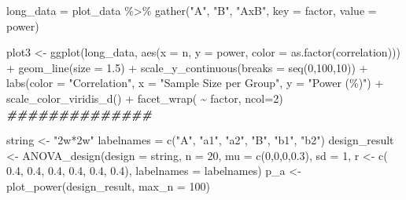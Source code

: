 \documentclass[
]{book}
\newenvironment{Shaded}{\begin{snugshade}}{\end{snugshade}}
\newcommand{\AttributeTok}[1]{\textcolor[rgb]{0.77,0.63,0.00}{#1}}
\newcommand{\DecValTok}[1]{\textcolor[rgb]{0.00,0.00,0.81}{#1}}
\newcommand{\DocumentationTok}[1]{\textcolor[rgb]{0.56,0.35,0.01}{\textbf{\textit{#1}}}}
\newcommand{\FloatTok}[1]{\textcolor[rgb]{0.00,0.00,0.81}{#1}}
\newcommand{\FunctionTok}[1]{\textcolor[rgb]{0.00,0.00,0.00}{#1}}
\newcommand{\NormalTok}[1]{#1}
\newcommand{\OtherTok}[1]{\textcolor[rgb]{0.56,0.35,0.01}{#1}}
\newcommand{\SpecialCharTok}[1]{\textcolor[rgb]{0.00,0.00,0.00}{#1}}
\newcommand{\StringTok}[1]{\textcolor[rgb]{0.31,0.60,0.02}{#1}}
\begin{document}
\begin{Shaded}
\begin{Highlighting}[]
\NormalTok{long\_data }\OtherTok{=}\NormalTok{ plot\_data }\SpecialCharTok{\%\textgreater{}\%}
  \FunctionTok{gather}\NormalTok{(}\StringTok{"A"}\NormalTok{, }\StringTok{"B"}\NormalTok{, }\StringTok{"AxB"}\NormalTok{, }\AttributeTok{key =}\NormalTok{ factor, }\AttributeTok{value =}\NormalTok{ power)}

\NormalTok{plot3 }\OtherTok{\textless{}{-}} \FunctionTok{ggplot}\NormalTok{(long\_data, }\FunctionTok{aes}\NormalTok{(}\AttributeTok{x =}\NormalTok{ n, }\AttributeTok{y =}\NormalTok{ power,}
                               \AttributeTok{color =} \FunctionTok{as.factor}\NormalTok{(correlation))) }\SpecialCharTok{+}
  \FunctionTok{geom\_line}\NormalTok{(}\AttributeTok{size =} \FloatTok{1.5}\NormalTok{) }\SpecialCharTok{+}
  \FunctionTok{scale\_y\_continuous}\NormalTok{(}\AttributeTok{breaks =} \FunctionTok{seq}\NormalTok{(}\DecValTok{0}\NormalTok{,}\DecValTok{100}\NormalTok{,}\DecValTok{10}\NormalTok{)) }\SpecialCharTok{+}
  \FunctionTok{labs}\NormalTok{(}\AttributeTok{color =} \StringTok{"Correlation"}\NormalTok{,}
       \AttributeTok{x =} \StringTok{"Sample Size per Group"}\NormalTok{,}
       \AttributeTok{y =} \StringTok{"Power (\%)"}\NormalTok{) }\SpecialCharTok{+}
  \FunctionTok{scale\_color\_viridis\_d}\NormalTok{() }\SpecialCharTok{+} \FunctionTok{facet\_wrap}\NormalTok{( }\SpecialCharTok{\textasciitilde{}}\NormalTok{ factor, }\AttributeTok{ncol=}\DecValTok{2}\NormalTok{)}
\DocumentationTok{\#\#\#\#\#\#\#\#\#\#\#\#\#\#}

\NormalTok{string }\OtherTok{\textless{}{-}} \StringTok{"2w*2w"}
\NormalTok{labelnames }\OtherTok{=} \FunctionTok{c}\NormalTok{(}\StringTok{"A"}\NormalTok{, }\StringTok{"a1"}\NormalTok{, }\StringTok{"a2"}\NormalTok{, }\StringTok{"B"}\NormalTok{, }\StringTok{"b1"}\NormalTok{, }\StringTok{"b2"}\NormalTok{)}
\NormalTok{design\_result }\OtherTok{\textless{}{-}} \FunctionTok{ANOVA\_design}\NormalTok{(}\AttributeTok{design =}\NormalTok{ string,}
                              \AttributeTok{n =} \DecValTok{20}\NormalTok{, }
                              \AttributeTok{mu =} \FunctionTok{c}\NormalTok{(}\DecValTok{0}\NormalTok{,}\DecValTok{0}\NormalTok{,}\DecValTok{0}\NormalTok{,}\FloatTok{0.3}\NormalTok{), }
                              \AttributeTok{sd =} \DecValTok{1}\NormalTok{, }
\NormalTok{                              r }\OtherTok{\textless{}{-}} \FunctionTok{c}\NormalTok{(}
                                \FloatTok{0.4}\NormalTok{, }\FloatTok{0.4}\NormalTok{, }\FloatTok{0.4}\NormalTok{,}
                                \FloatTok{0.4}\NormalTok{, }\FloatTok{0.4}\NormalTok{,}
                                \FloatTok{0.4}\NormalTok{),}
                              \AttributeTok{labelnames =}\NormalTok{ labelnames)}
\NormalTok{p\_a }\OtherTok{\textless{}{-}} \FunctionTok{plot\_power}\NormalTok{(design\_result,}
                  \AttributeTok{max\_n =} \DecValTok{100}\NormalTok{)}


\end{Highlighting}
\end{Shaded}
\end{document}
